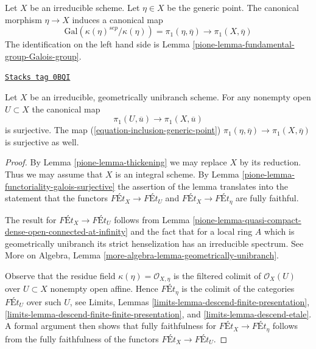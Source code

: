 Let $X$ be an irreducible scheme. Let $\eta \in X$ be the generic
point. The canonical morphism $\eta \to X$ induces a canonical map
\begin{equation}
\label{equation-inclusion-generic-point}
\text{Gal}(\kappa(\eta)^{sep}/\kappa(\eta)) = \pi_1(\eta, \overline{\eta})
\longrightarrow \pi_1(X, \overline{\eta})
\end{equation}
The identification on the left hand side is
Lemma \ref{pione-lemma-fundamental-group-Galois-group}.

\begin{lemma}
\label{pione-lemma-irreducible-geometrically-unibranch}
\href{https://stacks.math.columbia.edu/tag/0BQI}{\texttt{Stacks tag 0BQI}}

Let $X$ be an irreducible, geometrically unibranch scheme.
For any nonempty open $U \subset X$ the canonical map
$$
\pi_1(U, \overline{u}) \longrightarrow \pi_1(X, \overline{u})
$$
is surjective. The map (\ref{equation-inclusion-generic-point})
$\pi_1(\eta, \overline{\eta}) \to \pi_1(X, \overline{\eta})$
is surjective as well.
\end{lemma}

\begin{proof}

By Lemma \ref{pione-lemma-thickening} we may replace $X$ by its reduction.
Thus we may assume that $X$ is an integral scheme. By
Lemma \ref{pione-lemma-functoriality-galois-surjective}
the assertion of the lemma translates into the statement that
the functors $\textit{F\'Et}_X \to \textit{F\'Et}_U$ and
$\textit{F\'Et}_X \to \textit{F\'Et}_\eta$ are fully faithful.

\medskip\noindent
The result for $\textit{F\'Et}_X \to \textit{F\'Et}_U$ follows
from Lemma \ref{pione-lemma-quasi-compact-dense-open-connected-at-infinity}
and the fact that for a local ring $A$ which is
geometrically unibranch its strict henselization has an
irreducible spectrum. See
More on Algebra, Lemma \ref{more-algebra-lemma-geometrically-unibranch}.

\medskip\noindent
Observe that the residue field $\kappa(\eta) = \mathcal{O}_{X, \eta}$
is the filtered colimit of $\mathcal{O}_X(U)$ over $U \subset X$
nonempty open affine. Hence $\textit{F\'Et}_\eta$ is the colimit of the
categories $\textit{F\'Et}_U$ over such $U$, see
Limits, Lemmas \ref{limits-lemma-descend-finite-presentation},
\ref{limits-lemma-descend-finite-finite-presentation}, and
\ref{limits-lemma-descend-etale}.
A formal argument then shows that fully faithfulness for
$\textit{F\'Et}_X \to \textit{F\'Et}_\eta$ follows from the
fully faithfulness of the functors $\textit{F\'Et}_X \to \textit{F\'Et}_U$.
\end{proof}

